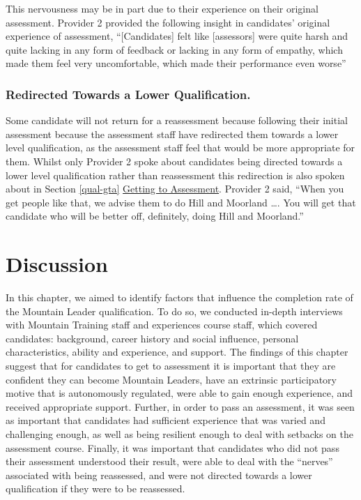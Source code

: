 \documentclass[
  12pt,
  a4paper,
]{book}
\begin{document}
This nervousness may be in part due to their experience on their original assessment. Provider 2 provided the following insight in candidates' original experience of assessment, ``{[}Candidates{]} felt like {[}assessors{]} were quite harsh and quite lacking in any form of feedback or lacking in any form of empathy, which made them feel very uncomfortable, which made their performance even worse''

\hypertarget{redirected-towards-a-lower-qualification.}{%
\subsubsection{Redirected Towards a Lower Qualification.}\label{redirected-towards-a-lower-qualification.}}

Some candidate will not return for a reassessment because following their initial assessment because the assessment staff have redirected them towards a lower level qualification, as the assessment staff feel that would be more appropriate for them. Whilst only Provider 2 spoke about candidates being directed towards a lower level qualification rather than reassessment this redirection is also spoken about in Section \ref{qual-gta} \protect\hyperlink{qual-gta}{Getting to Assessment}. Provider 2 said, ``When you get people like that, we advise them to do Hill and Moorland \ldots. You will get that candidate who will be better off, definitely, doing Hill and Moorland.''

\hypertarget{qual-discussion}{%
\section{Discussion}\label{qual-discussion}}

In this chapter, we aimed to identify factors that influence the completion rate of the Mountain Leader qualification. To do so, we conducted in-depth interviews with Mountain Training staff and experiences course staff, which covered candidates: background, career history and social influence, personal characteristics, ability and experience, and support. The findings of this chapter suggest that for candidates to get to assessment it is important that they are confident they can become Mountain Leaders, have an extrinsic participatory motive that is autonomously regulated, were able to gain enough experience, and received appropriate support. Further, in order to pass an assessment, it was seen as important that candidates had sufficient experience that was varied and challenging enough, as well as being resilient enough to deal with setbacks on the assessment course. Finally, it was important that candidates who did not pass their assessment understood their result, were able to deal with the ``nerves'' associated with being reassessed, and were not directed towards a lower qualification if they were to be reassessed.
\end{document}
